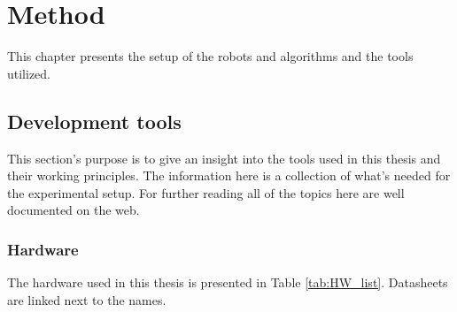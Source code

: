 \chapter{Method} %

This chapter presents the setup of the robots and algorithms and the tools utilized. 



\section{Development tools}
This section's purpose is to give an insight into the tools used in this thesis and their working principles. The information here is a collection of what's needed for the experimental setup. For further reading all of the topics here are well documented on the web. 
 

\subsection{Hardware}

The hardware used in this thesis is presented in Table \ref{tab:HW_list}. Datasheets are linked next to the names.

